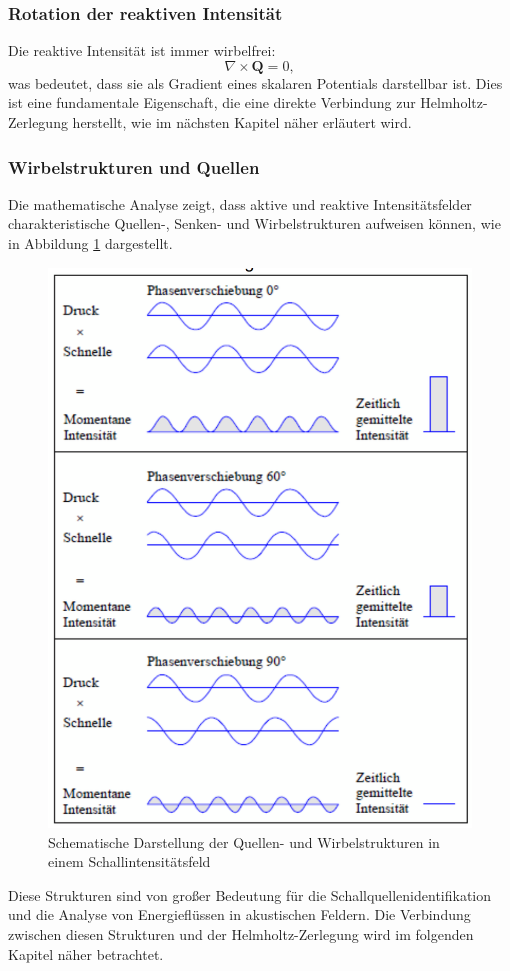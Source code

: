 \subsubsection{Rotation der reaktiven Intensität}

Die reaktive Intensität ist immer wirbelfrei:
\begin{equation}
\nabla \times \boldsymbol{Q} = 0,
\end{equation}
was bedeutet, dass sie als Gradient eines skalaren Potentials darstellbar ist. Dies ist eine fundamentale Eigenschaft, die eine direkte Verbindung zur Helmholtz-Zerlegung herstellt, wie im nächsten Kapitel näher erläutert wird.

\subsubsection{Wirbelstrukturen und Quellen}

Die mathematische Analyse zeigt, dass aktive und reaktive Intensitätsfelder charakteristische Quellen-, Senken- und Wirbelstrukturen aufweisen können, wie in Abbildung \ref{fig:Schallintensitaet} dargestellt.

\begin{figure}
\centering
\includegraphics[scale=0.4]{papers/helmholtz/images/Schallintensitaet.png}
\caption{Schematische Darstellung der Quellen- und Wirbelstrukturen in einem Schallintensitätsfeld}
\label{fig:Schallintensitaet}
\end{figure}

Diese Strukturen sind von großer Bedeutung für die Schallquellenidentifikation und die Analyse von Energieflüssen in akustischen Feldern. Die Verbindung zwischen diesen Strukturen und der Helmholtz-Zerlegung wird im folgenden Kapitel näher betrachtet.




